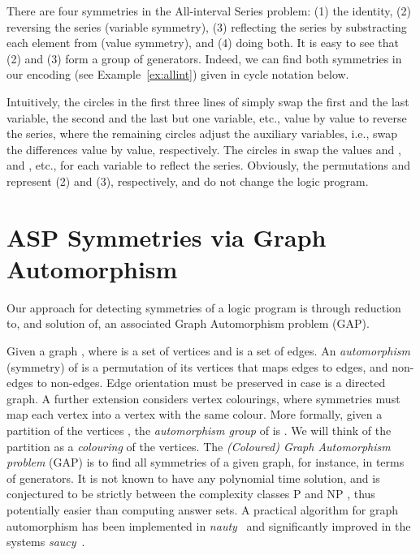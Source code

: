 \documentclass[envcountsame]{llncs}
\newcommand{\systemname}[1]{\emph{#1}}
\begin{document}
\begin{example} \label{ex:allintsym}
There are four symmetries in the All-interval Series problem: (1) the identity, (2) reversing the series (variable symmetry), (3) reflecting the series by substracting each element from  (value symmetry), and (4) doing both. It is easy to see that (2) and (3) form a group of generators. Indeed, we can find both symmetries in our encoding (see Example~\ref{ex:allint}) given in cycle notation below.

Intuitively, the circles in the first three lines of  simply swap the first and the last variable, the second and the last but one variable, etc., value by value to reverse the series, where the remaining circles adjust the auxiliary variables, i.e., swap the differences value by value, respectively. The circles in  swap the values  and ,  and , etc., for each variable to reflect the series. Obviously, the permutations  and  represent (2) and (3), respectively, and do not change the logic program.
\end{example}


\section{ASP Symmetries via Graph Automorphism \label{sec:sd}}
Our approach for detecting symmetries of a logic program is through reduction to, and solution of, an associated Graph Automorphism problem (GAP).

Given a graph , where  is a set of vertices and  is a set of edges. An \emph{automorphism} (symmetry) of  is a permutation of its vertices that maps edges to edges, and non-edges to non-edges. Edge orientation must be preserved in case  is a directed graph. A further extension considers vertex colourings, where symmetries must map each vertex into a vertex with the same colour. More formally, given a partition of the vertices , the \emph{automorphism group} of  \cite{mc81a} is . We will think of the partition  as a \emph{colouring} of the vertices.
The \emph{(Coloured) Graph Automorphism problem} (GAP) is to find all symmetries of a given graph, for instance, in terms of generators. It is not known to have any polynomial time solution, and is conjectured to be strictly between the complexity classes P and NP \cite{ba95a}, thus potentially easier than computing answer sets. A practical algorithm for graph automorphism has been implemented in \systemname{nauty}~\cite{mc81a} and significantly improved in the systems \systemname{saucy}~\cite{dalisama04a,dasakama08a}.
\end{document}
